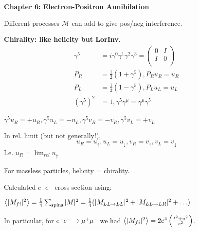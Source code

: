 \textbf{Chapter 6: Electron-Positron Annihilation}

Different processes $\mathcal{M}$ can add to give pos/neg interference.

\textbf{Chirality: like helicity but LorInv.}
\begin{align*}
    \gamma^5 &= i\gamma^0\gamma^1\gamma^2\gamma^3 = \begin{pmatrix}
        0 & I\\
        I & 0 \\
    \end{pmatrix}\\
    P_R &= \frac{1}{2}(1 + \gamma^5), P_R u_R = u_R \\
    P_L &= \frac{1}{2}(1 - \gamma^5), P_L u_L = u_L \\
    (\gamma^5)^2 &= 1, \gamma^5\gamma^\mu = \gamma^\mu\gamma^5
\end{align*}

$\gamma^5 u_R = +u_R, \gamma^5 u_L = -u_L, \gamma^5 v_R = -v_R, \gamma^5 v_L = +v_L$

In rel. limit (but not generally!),
$$u_R = u_\uparrow, u_L = u_\downarrow, v_R = v_\uparrow, v_L = v_\downarrow$$
I.e. $u_R = \lim_{rel} u_\uparrow$

For massless particles, helicity = chirality.

Calculated $e^+ e^-$ cross section using:

$\expval{|M_{fi}|^2} = \frac{1}{4} \sum_{\text{spins}} |M|^2 = \frac{1}{4}(|M_{LL \to LL}|^2 + |M_{LL \to LR}|^2 + \ldots)$

In particular, for $e^+e^- \to \mu^+\mu^-$ we had $\expval{|M_{fi}|^2} = 2e^4 \left(\frac{t^2+u^2}{s^2}\right)$.


